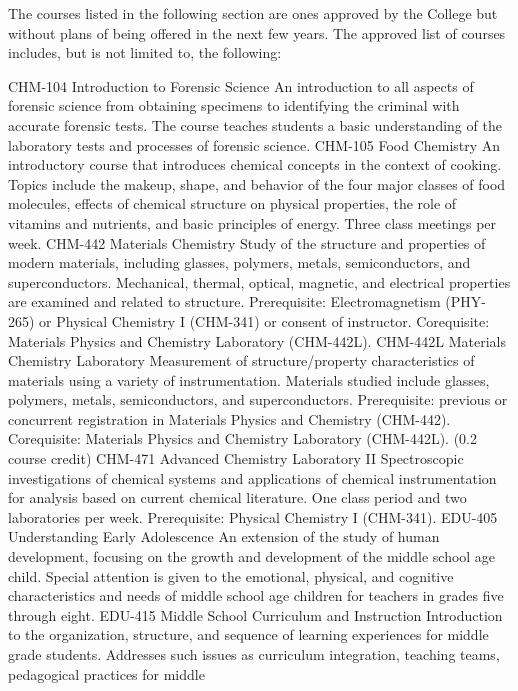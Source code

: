 \documentclass[
  letterpaper,
]{scrbook}
\begin{document}
The courses listed in the following section are ones approved by the
College but without plans of being offered in the next few years. The
approved list of courses includes, but is not limited to, the following:

CHM-104 Introduction to Forensic Science An introduction to all aspects
of forensic science from obtaining specimens to identifying the criminal
with accurate forensic tests. The course teaches students a basic
understanding of the laboratory tests and processes of forensic science.
CHM-105 Food Chemistry An introductory course that introduces chemical
concepts in the context of cooking. Topics include the makeup, shape,
and behavior of the four major classes of food molecules, effects of
chemical structure on physical properties, the role of vitamins and
nutrients, and basic principles of energy. Three class meetings per
week. CHM-442 Materials Chemistry Study of the structure and properties
of modern materials, including glasses, polymers, metals,
semiconductors, and superconductors. Mechanical, thermal, optical,
magnetic, and electrical properties are examined and related to
structure. Prerequisite: Electromagnetism (PHY-265) or Physical
Chemistry I (CHM-341) or consent of instructor. Corequisite: Materials
Physics and Chemistry Laboratory (CHM-442L). CHM-442L Materials
Chemistry Laboratory Measurement of structure/property characteristics
of materials using a variety of instrumentation. Materials studied
include glasses, polymers, metals, semiconductors, and superconductors.
Prerequisite: previous or concurrent registration in Materials Physics
and Chemistry (CHM-442). Corequisite: Materials Physics and Chemistry
Laboratory (CHM-442L). (0.2 course credit) CHM-471 Advanced Chemistry
Laboratory II Spectroscopic investigations of chemical systems and
applications of chemical instrumentation for analysis based on current
chemical literature. One class period and two laboratories per week.
Prerequisite: Physical Chemistry I (CHM-341). EDU-405 Understanding
Early Adolescence An extension of the study of human development,
focusing on the growth and development of the middle school age child.
Special attention is given to the emotional, physical, and cognitive
characteristics and needs of middle school age children for teachers in
grades five through eight. EDU-415 Middle School Curriculum and
Instruction Introduction to the organization, structure, and sequence of
learning experiences for middle grade students. Addresses such issues as
curriculum integration, teaching teams, pedagogical practices for middle
\end{document}
